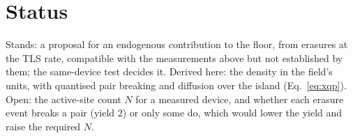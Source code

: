 \section{Status}
Stands: a proposal for an endogenous contribution to the floor, from erasures at the TLS rate, compatible with the measurements above but not
established by them; the same-device test decides it. Derived here: the density in the field's units, with quantised pair breaking and diffusion over the island (Eq.~\ref{eq:xqp}). Open: the
active-site count $N$ for a measured device, and whether each erasure event breaks a pair (yield $2$) or only some do, which would lower the yield and
raise the required $N$.
